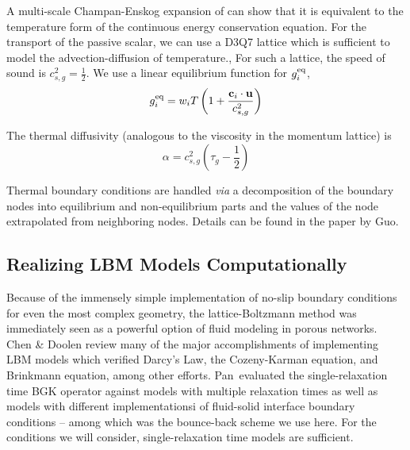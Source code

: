 A multi-scale Champan-Enskog expansion of  can show that it is equivalent to the temperature form of the continuous energy conservation equation.\cite{Guo2002} For the transport of the passive scalar, we can use a D3Q7 lattice which is sufficient to model the advection-diffusion of temperature.\cite{Latt2007,Parmigiani2011}, For such a lattice, the speed of sound is $c^2_{s,g} = \frac{1}{2}$. We use a linear equilibrium function for $g_i^{\text{eq}}$,
\begin{equation}
	g_i^{\text{eq}} = w_i T \left(1+\frac{\mathbf{c}_i\cdot\mathbf{u}}{c_{s,g}^2}\right)
\end{equation}

The thermal diffusivity (analogous to the viscosity in the momentum lattice) is 
\begin{equation}
	\alpha = c_{s,g}^2\left(\tau_{g} - \frac{1}{2}\right)
\end{equation}

Thermal boundary conditions are handled \textit{via} a decomposition of the boundary nodes into equilibrium and non-equilibrium parts and the values of the node extrapolated from neighboring nodes. Details can be found in the paper by Guo\etal.\cite{Guo2002}


\subsection{Realizing LBM Models Computationally}
Because of the immensely simple implementation of no-slip boundary conditions for even the most complex geometry, the lattice-Boltzmann method was immediately seen as a powerful option of fluid modeling in porous networks. Chen \& Doolen review many of the major accomplishments of implementing LBM models which verified Darcy's Law, the Cozeny-Karman equation, and Brinkmann equation, among other efforts.\cite{Chen1998a} Pan\etal~evaluated the single-relaxation time BGK operator against models with multiple relaxation times as well as models with different implementationsi of fluid-solid interface boundary conditions -- among which was the bounce-back scheme we use here.\cite{Pan2006} For the conditions we will consider, single-relaxation time models are sufficient.

